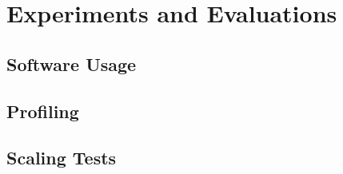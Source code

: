 \chapter{Experiments and Evaluations}
\label{chapter:experiments_and_evaluations}
\section{Software Usage}
\section{Profiling}
\section{Scaling Tests}
